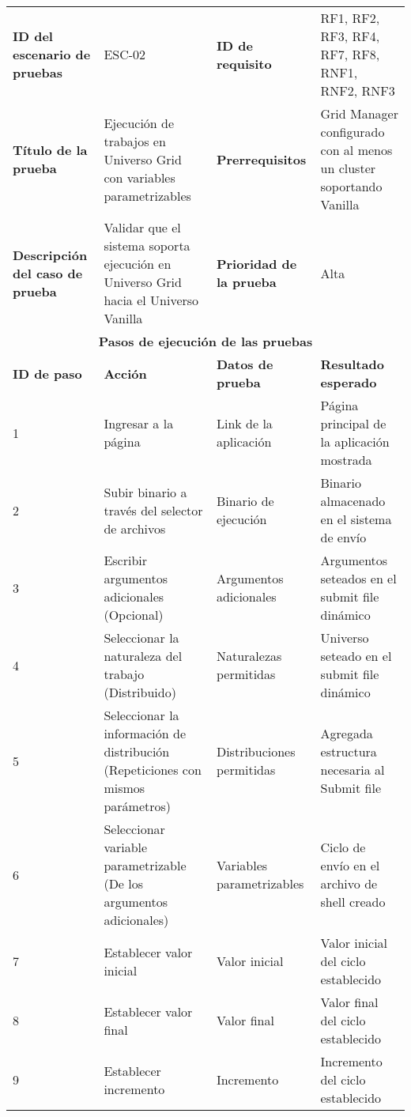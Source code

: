 \begin{table}[H]
	\centering
	\renewcommand{\arraystretch}{1.2} %
	\fontsize{9pt}{10pt}\selectfont %
	\begin{tabular}{|p{2cm}|p{4cm}|p{2.5cm}|p{4.7cm}|} %
		\hline
		\textbf{ID del escenario de pruebas} & ESC-02 & \textbf{ID de requisito} & RF1, RF2, RF3, RF4, RF7, RF8, RNF1, RNF2, RNF3 \\
        \textbf{Título de la prueba} & Ejecución de trabajos en Universo Grid con variables parametrizables & \textbf{Prerrequisitos} & Grid Manager configurado con al menos un cluster soportando Vanilla \\
        \textbf{Descripción del caso de prueba} & Validar que el sistema soporta ejecución en Universo Grid hacia el Universo Vanilla & \textbf{Prioridad de la prueba} & Alta \\
        \hline
        \multicolumn{4}{|c|}{\textbf{Pasos de ejecución de las pruebas}} \\
        \hline
        \textbf{ID de paso} & \textbf{Acción} & \textbf{Datos de prueba} & \textbf{Resultado esperado} \\
		1 & Ingresar a la página & Link de la aplicación & Página principal de la aplicación mostrada \\
        2 & Subir binario a través del selector de archivos & Binario de ejecución & Binario almacenado en el sistema de envío \\
        3 & Escribir argumentos adicionales (Opcional) & Argumentos adicionales & Argumentos seteados en el submit file dinámico \\
        4 & Seleccionar la naturaleza del trabajo (Distribuido) & Naturalezas permitidas & Universo seteado en el submit file dinámico \\
        5 & Seleccionar la información de distribución (Repeticiones con mismos parámetros) & Distribuciones permitidas & Agregada estructura necesaria al Submit file \\
        6 & Seleccionar variable parametrizable (De los argumentos adicionales) & Variables parametrizables & Ciclo de envío en el archivo de shell creado \\
        7 & Establecer valor inicial & Valor inicial & Valor inicial del ciclo establecido \\
        8 & Establecer valor final & Valor final & Valor final del ciclo establecido \\
        9 & Establecer incremento & Incremento & Incremento del ciclo establecido \\

\end{tabular}
\end{table}

